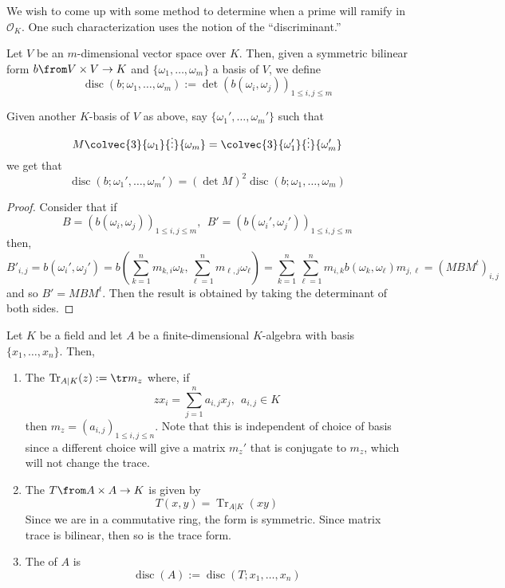 \documentclass[11pt,leqno,oneside]{amsart}
\numberwithin{thm}{section}
\renewcommand{\O}{\mathcal{O}}
\newcommand{\disc}{\operatorname{disc}}
\newcommand{\Tr}{\operatorname{Tr}}
\newcommand{\transpose}{t}
\begin{document}
We wish to come up with some method to determine when a prime will
ramify in \(\O_K\). One such characterization uses the notion of the ``discriminant.''
\begin{defn}
  Let \(V\) be an \(m\)-dimensional vector space over \(K\). Then,
  given a symmetric bilinear form \(b \from V \times V \to K\) and
  \(\{\omega_1, \ldots, \omega_m\}\) a basis of \(V\), we define \[
    \disc(b;\omega_1, \ldots, \omega_m) :=
    \det(b(\omega_i,\omega_j))_{1 \leq i,j \leq m}
  \]
\end{defn}
\begin{prop}
  Given another \(K\)-basis of \(V\) as above, say \(\{\omega_1',
  \ldots, \omega_m'\}\) such that \[
    M \colvec{3}{\omega_1}{\vdots}{\omega_m} = \colvec{3}{\omega_1'}{\vdots}{\omega_m'}
  \]
  we get that \[
    \disc(b;\omega_1', \ldots, \omega_m') = (\det M)^2
    \disc(b;\omega_1, \ldots, \omega_m)
  \]
\end{prop}
\begin{proof}
  Consider that if \[
    B = (b(\omega_i,\omega_j))_{1 \leq i,j \leq m}, \ \ B' =
    (b(\omega_i', \omega_j'))_{1 \leq i,j \leq m}
  \]
  then, \[
    B'_{i,j} = b(\omega_i', \omega_j') = b\left(\sum_{k=1}^n m_{k,i}
      \omega_k, 
    \sum_{\ell=1}^n m_{\ell,j} \omega_\ell\right) = \sum_{k=1}^n
    \sum_{\ell=1}^n m_{i,k} b(\omega_k, \omega_\ell) m_{j,\ell} =
    (MBM^\transpose)_{i,j} 
  \]
  and so \(B' = MBM^\transpose\).
  Then the result is obtained by taking
  the determinant of both sides.
\end{proof}
\begin{defn}
  Let \(K\) be a field and let \(A\) be a finite-dimensional
  \(K\)-algebra with basis \(\{x_1, 
  \ldots, x_n\}\). Then,
  \begin{enumerate}
  \item The  \(\Tr_{A|K}(z) := \tr m_z\) where, if \[
      zx_i = \sum_{j=1}^n a_{i,j} x_j, \ \ a_{i,j} \in K
    \]
    then \(m_z = (a_{i,j})_{1 \leq i,j \leq n}\). Note that this is
    independent of choice of basis since a different choice will give
    a matrix \(m_z'\) that is conjugate to \(m_z\), which will not
    change the trace.
  \item The  \(T \from A \times A \to K\) is given
    by \[
      T(x,y) = \Tr_{A|K}(xy)
    \]
    Since we are in a commutative ring, the form is symmetric. Since
    matrix trace is bilinear, then so is the trace form.
  \item The  of \(A\) is 
  \[
      \disc(A) := \disc(T;x_1, \ldots, x_n)
    \]
  \end{enumerate}
\end{defn}
\end{document}
